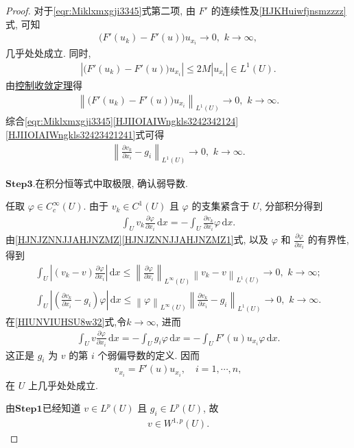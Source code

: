 \documentclass[../../main.tex]{subfiles}
\begin{document}
\begin{proof}
对于\eqref{eqr:Miklxmxgji3345}式第二项, 由 $F'$ 的连续性及\eqref{HJKHuiwfjnsmzzzz}式, 可知
\begin{align*}
\bigl(F'(u_k)-F'(u)\bigr)u_{x_i}\longrightarrow 0,\,\,k\to \infty,
\end{align*}
几乎处处成立. 同时,
\begin{align*}
\left|\bigl(F'(u_k)-F'(u)\bigr)u_{x_i}\right|
\leqslant 2M|u_{x_i}|\in L^{1}(U).
\end{align*}
由\hyperref[Real Analysis-theorem:控制收敛定理]{控制收敛定理}得
\begin{align}\label{HJIIOIAIWngkls32423421241}
\left\|\bigl(F'(u_k)-F'(u)\bigr)u_{x_i}\right\|_{L^{1}(U)}
\longrightarrow 0,\,\,k\to \infty.
\end{align}
综合\eqref{eqr:Miklxmxgji3345}\eqref{HJIIOIAIWngkls3242342124}\eqref{HJIIOIAIWngkls32423421241}式可得
\begin{align}\label{HJNJZNNJJAHJNZMZ1}
\left\|\frac{\partial v_k}{\partial x_i}-g_i\right\|_{L^{1}(U)}
\longrightarrow 0,\,\,k\to \infty.
\end{align}

\noindent$\mathbf{Step}\bm{3}.${\heiti 在积分恒等式中取极限, 确认弱导数.}

任取 $\varphi\in C_c^{\infty}(U)$. 由于 $v_k\in C^{1}(U)$ 且 $\varphi$ 的支集紧含于 $U$, 分部积分得到
\begin{align}\label{HIUNVIUHSU8w32}
\int_U v_k\frac{\partial\varphi}{\partial x_i}\,\mathrm{d}x
=-\int_U\frac{\partial v_k}{\partial x_i}\varphi\,\mathrm{d}x.
\end{align}
由\eqref{HJNJZNNJJAHJNZMZ}\eqref{HJNJZNNJJAHJNZMZ1}式, 以及 $\varphi$ 和 $\frac{\partial\varphi}{\partial x_i}$ 的有界性, 得到
\begin{gather*}
\int_U{\left| \left( v_k-v \right) \frac{\partial \varphi}{\partial x_i} \right|\,\mathrm{d}x}\leqslant \left\| \frac{\partial \varphi}{\partial x_i} \right\| _{L^{\infty}\left( U \right)}\left\| v_k-v \right\| _{L^1\left( U \right)}\rightarrow 0,\,\,k\rightarrow \infty ;
\\
\int_U{\left| \left( \frac{\partial v_k}{\partial x_i}-g_i \right) \varphi \right|\,\mathrm{d}x}\leqslant \left\| \varphi \right\| _{L^{\infty}\left( U \right)}\left\| \frac{\partial v_k}{\partial x_i}-g_i \right\| _{L^1\left( U \right)}\rightarrow 0,\,\,k\rightarrow \infty .
\end{gather*}
在\eqref{HIUNVIUHSU8w32}式,令$k\to\infty$, 进而
\begin{align*}
\int_U v\frac{\partial\varphi}{\partial x_i}\,\mathrm{d}x
=-\int_U g_i\varphi\,\mathrm{d}x
=-\int_U F'(u)u_{x_i}\varphi\,\mathrm{d}x.
\end{align*}
这正是 $g_i$ 为 $v$ 的第 $i$ 个弱偏导数的定义. 因而
\begin{align*}
v_{x_i}=F'(u)u_{x_i},\quad i=1,\cdots,n,
\end{align*}
在 $U$ 上几乎处处成立.

由$\mathbf{Step1}$已经知道 $v\in L^{p}(U)$ 且 $g_i\in L^{p}(U)$, 故
\begin{align*}
v\in W^{1,p}(U).
\end{align*}
\end{proof}
\end{document}
